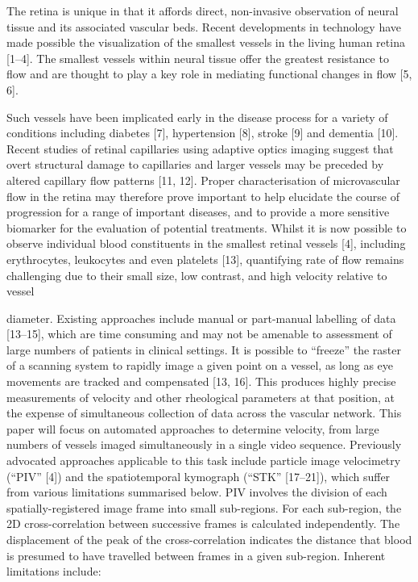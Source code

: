 \documentclass[]{article}
\begin{document}
The retina is unique in that it affords direct, non-invasive observation of neural tissue and its associated vascular beds. 
Recent developments in technology have made possible the visualization of the smallest vessels in the living human retina [1–4]. The smallest vessels within neural tissue offer the greatest resistance to flow and are thought to play a key role in mediating functional changes in flow [5, 6].

 Such vessels have been implicated early in the disease process for a variety of conditions including diabetes [7], hypertension [8], stroke [9] and dementia [10]. Recent studies of retinal capillaries using adaptive optics imaging suggest that overt structural damage to capillaries and larger vessels may be preceded by altered capillary flow patterns [11, 12]. Proper characterisation of microvascular flow in the retina may therefore prove important to help elucidate the course of progression for a range of important diseases, and to provide a more sensitive biomarker for the evaluation of potential treatments. Whilst it is now possible to observe individual blood constituents in the smallest retinal vessels [4], including erythrocytes, leukocytes and even platelets [13], quantifying rate of flow remains challenging due to their small size, low contrast, and high velocity relative to vessel


diameter. Existing approaches include manual or part-manual labelling of data [13–15], which are time consuming and may not be amenable to assessment of large numbers of patients in clinical settings. It is possible to “freeze” the raster of a scanning system to rapidly image a given point on a vessel, as long as eye movements are tracked and compensated [13, 16]. This produces highly precise measurements of velocity and other rheological parameters at that position, at the expense of simultaneous collection of data across the vascular network. This paper will focus on automated approaches to determine velocity, from large numbers of vessels imaged simultaneously in a single video sequence. Previously advocated approaches applicable to this task include particle image velocimetry (“PIV” [4]) and the spatiotemporal kymograph (“STK” [17–21]), which suffer from various limitations summarised below. PIV involves the division of each spatially-registered image frame into small sub-regions. For each sub-region, the 2D cross-correlation between successive frames is calculated independently. The displacement of the peak of the cross-correlation indicates the distance that blood is presumed to have travelled between frames in a given sub-region. Inherent limitations include:
\end{document}
